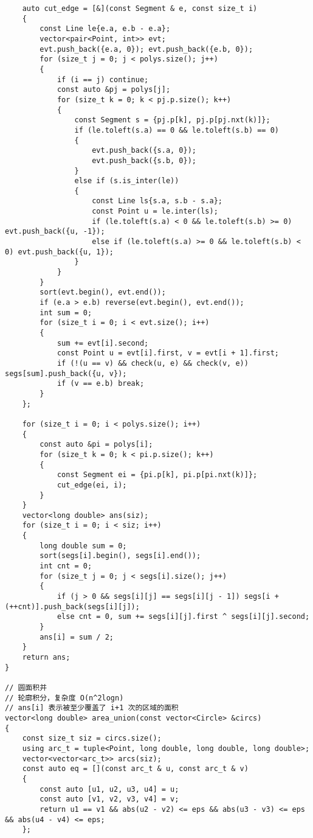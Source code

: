 \documentclass[a4paper,10pt]{article}
\begin{document}
\begin{lstlisting}
    auto cut_edge = [&](const Segment & e, const size_t i)
    {
        const Line le{e.a, e.b - e.a};
        vector<pair<Point, int>> evt;
        evt.push_back({e.a, 0}); evt.push_back({e.b, 0});
        for (size_t j = 0; j < polys.size(); j++)
        {
            if (i == j) continue;
            const auto &pj = polys[j];
            for (size_t k = 0; k < pj.p.size(); k++)
            {
                const Segment s = {pj.p[k], pj.p[pj.nxt(k)]};
                if (le.toleft(s.a) == 0 && le.toleft(s.b) == 0)
                {
                    evt.push_back({s.a, 0});
                    evt.push_back({s.b, 0});
                }
                else if (s.is_inter(le))
                {
                    const Line ls{s.a, s.b - s.a};
                    const Point u = le.inter(ls);
                    if (le.toleft(s.a) < 0 && le.toleft(s.b) >= 0) evt.push_back({u, -1});
                    else if (le.toleft(s.a) >= 0 && le.toleft(s.b) < 0) evt.push_back({u, 1});
                }
            }
        }
        sort(evt.begin(), evt.end());
        if (e.a > e.b) reverse(evt.begin(), evt.end());
        int sum = 0;
        for (size_t i = 0; i < evt.size(); i++)
        {
            sum += evt[i].second;
            const Point u = evt[i].first, v = evt[i + 1].first;
            if (!(u == v) && check(u, e) && check(v, e)) segs[sum].push_back({u, v});
            if (v == e.b) break;
        }
    };

    for (size_t i = 0; i < polys.size(); i++)
    {
        const auto &pi = polys[i];
        for (size_t k = 0; k < pi.p.size(); k++)
        {
            const Segment ei = {pi.p[k], pi.p[pi.nxt(k)]};
            cut_edge(ei, i);
        }
    }
    vector<long double> ans(siz);
    for (size_t i = 0; i < siz; i++)
    {
        long double sum = 0;
        sort(segs[i].begin(), segs[i].end());
        int cnt = 0;
        for (size_t j = 0; j < segs[i].size(); j++)
        {
            if (j > 0 && segs[i][j] == segs[i][j - 1]) segs[i + (++cnt)].push_back(segs[i][j]);
            else cnt = 0, sum += segs[i][j].first ^ segs[i][j].second;
        }
        ans[i] = sum / 2;
    }
    return ans;
}

// 圆面积并
// 轮廓积分，复杂度 O(n^2logn)
// ans[i] 表示被至少覆盖了 i+1 次的区域的面积
vector<long double> area_union(const vector<Circle> &circs)
{
    const size_t siz = circs.size();
    using arc_t = tuple<Point, long double, long double, long double>;
    vector<vector<arc_t>> arcs(siz);
    const auto eq = [](const arc_t & u, const arc_t & v)
    {
        const auto [u1, u2, u3, u4] = u;
        const auto [v1, v2, v3, v4] = v;
        return u1 == v1 && abs(u2 - v2) <= eps && abs(u3 - v3) <= eps && abs(u4 - v4) <= eps;
    };


\end{lstlisting}
\end{document}
